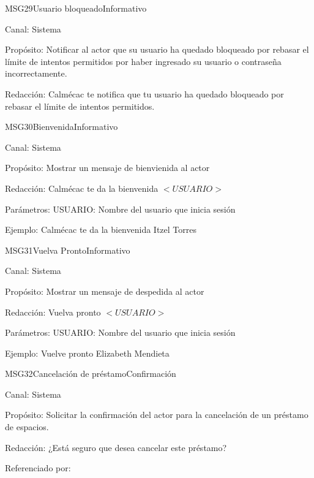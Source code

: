 \begin{mensaje}{MSG29}{Usuario bloqueado}{Informativo}
	\item[Canal:] Sistema
	\item[Propósito:] Notificar al actor que su usuario ha quedado bloqueado por rebasar el límite de intentos permitidos por haber ingresado su usuario o contraseña incorrectamente.
	\item[Redacción:] Calmécac te notifica que tu usuario ha quedado bloqueado por rebasar el límite de intentos permitidos.
\end{mensaje}

\begin{mensaje}{MSG30}{Bienvenida}{Informativo}
	\item[Canal:] Sistema
	\item[Propósito:] Mostrar un mensaje de bienvienida al actor
	\item[Redacción:] Calmécac te da la bienvenida $<USUARIO>$
	\item[Parámetros:] USUARIO: Nombre del usuario que inicia sesión
	\item[Ejemplo:] Calmécac te da la bienvenida Itzel Torres
\end{mensaje}

\begin{mensaje}{MSG31}{Vuelva Pronto}{Informativo}
	\item[Canal:] Sistema
	\item[Propósito:] Mostrar un mensaje de despedida al actor
	\item[Redacción:] Vuelva pronto $<USUARIO>$
	\item[Parámetros:] USUARIO: Nombre del usuario que inicia sesión
	\item[Ejemplo:] Vuelve pronto Elizabeth Mendieta
\end{mensaje}


\begin{mensaje}{MSG32}{Cancelación de préstamo}{Confirmación}
	\item[Canal:] Sistema
	\item[Propósito:] Solicitar la confirmación del actor para la cancelación de un préstamo de espacios.
	\item[Redacción:] ¿Está seguro que desea cancelar este préstamo?
	\item[Referenciado por: ] 
\end{mensaje}

